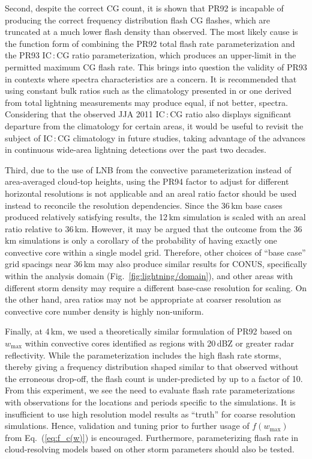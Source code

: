 Second, despite the correct CG count, it is shown that PR92 is incapable of
producing the correct frequency distribution flash CG flashes, which are
truncated at a much lower flash density than observed. The most likely cause
is the function form of combining the PR92 total flash rate parameterization
and the PR93 IC\,:\,CG ratio parameterization, which produces an upper-limit
in the permitted maximum CG flash rate. This brings into question the
validity of PR93 in contexts where spectra characteristics are a concern. It
is recommended that using constant bulk ratios such as the climatology
presented in \citet{Boccippio:2001ys} or one derived from total lightning
measurements may produce equal, if not better, spectra. Considering that the
observed JJA 2011 IC\,:\,CG ratio also displays significant departure from
the \citet{Boccippio:2001ys} climatology for certain areas, it would be
useful to revisit the subject of IC\,:\,CG climatology in future studies,
taking
advantage of the advances in continuous wide-area lightning detections over
the past two decades.

Third, due to the use of LNB from the convective parameterization instead of
area-averaged cloud-top heights, using the PR94 factor to adjust for different
horizontal resolutions is not applicable and an areal ratio factor should be
used instead to reconcile the resolution dependencies. Since the 36\,\unit{km} base
cases produced relatively satisfying results, the 12\,\unit{km} simulation is
scaled with an areal ratio relative to 36\,\unit{km}. However, it may be
argued that the outcome from the 36\,\unit{km} simulations is only a
corollary of the probability of having exactly one convective core within a
single model grid. Therefore, other choices of ``base case'' grid spacings
near 36\,\unit{km} may also produce similar results for CONUS, specifically
within the analysis domain (Fig.~\ref{fig:lightning/domain}), and other areas with
different storm density may require a different base-case resolution for
scaling. On the other hand, area ratios may not be appropriate at coarser
resolution as convective core number density is highly non-uniform.

Finally, at 4\,\unit{km}, we used a theoretically similar formulation of PR92
based on $w_{\max}$ within convective cores identified as regions with
20\,\unit{dBZ} or greater radar reflectivity. While the parameterization
includes the high flash rate storms, thereby giving a frequency distribution
shaped similar to that observed without the erroneous drop-off, the flash
count is under-predicted by up to a factor of 10. From this experiment, we
see the need to evaluate flash rate parameterizations with observations for
the locations and periods specific to the simulations. It is insufficient to
use high resolution model results as ``truth'' for coarse resolution
simulations. Hence, validation and tuning prior to further usage of
$f(w_{\max})$ from Eq.~(\ref{eq:f_c(w)}) is encouraged. Furthermore,
parameterizing flash rate in cloud-resolving models based on other storm
parameters \citep{Barthe:2010uq} should also be tested.

